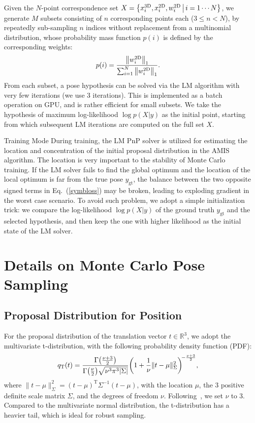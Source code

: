 \documentclass[10pt,twocolumn,letterpaper]{article}
\makeatletter
\let\originalleft\left
\let\originalright\right
\renewcommand{\left}{\mathopen{}\mathclose\bgroup\originalleft}
\renewcommand{\right}{\aftergroup\egroup\originalright}
\renewcommand{\paragraph}{
  \@startsection{paragraph}{4}
  {\z@}{1.0ex \@plus 0ex \@minus .3ex}{-1em}
  {\normalfont\normalsize\bfseries}
}
\makeatother
\begin{document}
Given the $N$-point correspondence set $X = \left\{x^\text{3D}_i,x^\text{2D}_i,w^\text{2D}_i\,\middle|\,i=1\cdots N\right\}$, we generate $M$ subsets consisting of $n$ corresponding points each ($3 \leq n < N$), by repeatedly sub-sampling $n$ indices without replacement from a multinomial distribution, whose probability mass function $p(i)$ is defined by the corresponding weights:
\begin{equation}
    p(i) = \frac{\left\|w^\text{2D}_i\right\|_1}{\sum_{i=1}^N{\left\|w^\text{2D}_i\right\|_1}}.
\end{equation}
From each subset, a pose hypothesis can be solved via the LM algorithm with very few iterations (we use 3 iterations). This is implemented as a batch operation on GPU, and is rather efficient for small subsets. We take the hypothesis of maximum log-likelihood $\log{p(X|y)}$ as the initial point, starting from which subsequent LM iterations are computed on the full set $X$. 

\paragraph{Training Mode}
During training, the LM PnP solver is utilized for estimating the location and concentration of the initial proposal distribution in the AMIS algorithm. The location is very important to the stability of Monte Carlo training. If the LM solver fails to find the global optimum and the location of the local optimum is far from the true pose $y_\text{gt}$, the balance between the two opposite signed terms in Eq.~(\ref{symbloss}) may be broken, leading to exploding gradient in the worst case scenario. To avoid such problem, we adopt a simple initialization trick: we compare the log-likelihood $\log{p(X|y)}$ of the ground truth $y_\text{gt}$ and the selected hypothesis, and then keep the one with higher likelihood as the initial state of the LM solver. 

\section{Details on Monte Carlo Pose Sampling}

\subsection{Proposal Distribution for Position}

For the proposal distribution of the translation vector $t \in \mathbb{R}^3$, we adopt the multivariate t-distribution, with the following probability density function (PDF):
\begin{equation}
    q_\text{T}(t) = \frac{\Gamma\left(\frac{\nu + 3}{2}\right)}{\Gamma\left(\frac{\nu}{2}\right) \sqrt{\nu^3 \pi^3 |\Sigma|}} \left( 1 + \frac{1}{\nu} \| t-\mu \|_{\Sigma}^2 \right)^{\negmedspace -\frac{\nu+3}{2}},
\end{equation}
where $\| t-\mu \|_{\Sigma}^2 = (t-\mu)^\text{T} \Sigma^{-1} (t-\mu)$, with the location $\mu$, the 3 positive definite scale matrix $\Sigma$, and the degrees of freedom $\nu$. Following~\cite{amis}, we set $\nu$ to 3. Compared to the multivariate normal distribution, the t-distribution has a heavier tail, which is ideal for robust sampling. 
\end{document}
